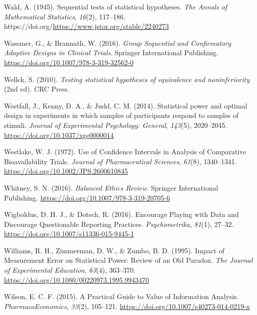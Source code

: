 \documentclass[
  letterpaper,
  DIV=11,
  numbers=noendperiod]{scrreprt}
\newlength{\cslhangindent}
\newlength{\cslentryspacingunit} %
\newenvironment{CSLReferences}[2] %
 {%
  \setlength{\parindent}{0pt}
  \ifodd #1
  \let\oldpar\par
  \def\par{\hangindent=\cslhangindent\oldpar}
  \fi
  \setlength{\parskip}{#2\cslentryspacingunit}
 }%
 {}
\begin{document}
\begin{CSLReferences}{1}{0}
\leavevmode{}%
Wald, A. (1945). Sequential tests of statistical hypotheses. \emph{The
Annals of Mathematical Statistics}, \emph{16}(2), 117--186.
https://doi.org/\url{https://www.jstor.org/stable/2240273}

\leavevmode{}%
Wassmer, G., \& Brannath, W. (2016). \emph{Group {Sequential} and
{Confirmatory Adaptive Designs} in {Clinical Trials}}. {Springer
International Publishing}.
\url{https://doi.org/10.1007/978-3-319-32562-0}

\leavevmode{}%
Wellek, S. (2010). \emph{Testing statistical hypotheses of equivalence
and noninferiority} (2nd ed). {CRC Press}.

\leavevmode{}%
Westfall, J., Kenny, D. A., \& Judd, C. M. (2014). Statistical power and
optimal design in experiments in which samples of participants respond
to samples of stimuli. \emph{Journal of Experimental Psychology:
General}, \emph{143}(5), 2020--2045.
\url{https://doi.org/10.1037/xge0000014}

\leavevmode{}%
Westlake, W. J. (1972). Use of {Confidence Intervals} in {Analysis} of
{Comparative Bioavailability Trials}. \emph{Journal of Pharmaceutical
Sciences}, \emph{61}(8), 1340--1341.
\url{https://doi.org/10.1002/JPS.2600610845}

\leavevmode{}%
Whitney, S. N. (2016). \emph{Balanced {Ethics Review}}. {Springer
International Publishing}.
\url{https://doi.org/10.1007/978-3-319-20705-6}

\leavevmode{}%
Wigboldus, D. H. J., \& Dotsch, R. (2016). Encourage {Playing} with
{Data} and {Discourage Questionable Reporting Practices}.
\emph{Psychometrika}, \emph{81}(1), 27--32.
\url{https://doi.org/10.1007/s11336-015-9445-1}

\leavevmode{}%
Williams, R. H., Zimmerman, D. W., \& Zumbo, B. D. (1995). Impact of
{Measurement Error} on {Statistical Power}: {Review} of an {Old
Paradox}. \emph{The Journal of Experimental Education}, \emph{63}(4),
363--370. \url{https://doi.org/10.1080/00220973.1995.9943470}

\leavevmode{}%
Wilson, E. C. F. (2015). A {Practical Guide} to {Value} of {Information
Analysis}. \emph{PharmacoEconomics}, \emph{33}(2), 105--121.
\url{https://doi.org/10.1007/s40273-014-0219-x}


\end{CSLReferences}
\end{document}
